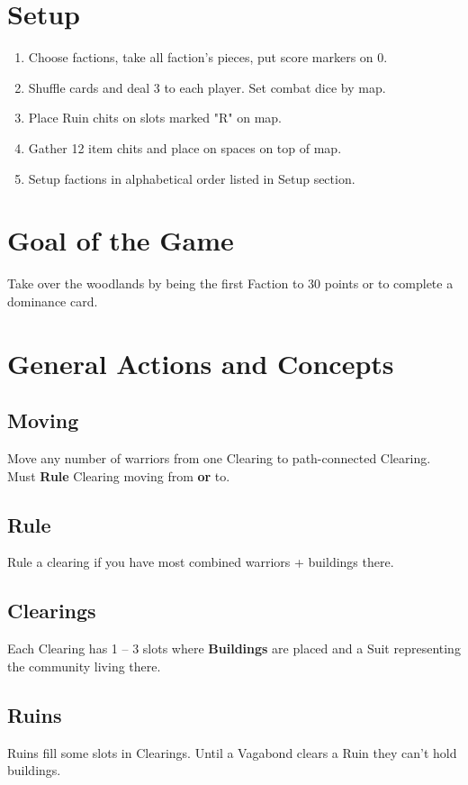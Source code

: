 \documentclass[12pt]{article}
\newenvironment{enumerateCustom}
{\begin{enumerate}
  \setlength{\itemsep}{1pt}
  \setlength{\parskip}{0pt}
  \setlength{\parsep}{0pt}}
{\end{enumerate}}
\begin{document}
\begin{multicols*}{2}

\section*{Setup}
\begin{enumerateCustom}
    \item Choose factions, take all faction's pieces, put score markers on 0.
    \item Shuffle cards and deal 3 to each player. Set combat dice by map.
    \item Place Ruin chits on slots marked "R" on map.
    \item Gather 12 item chits and place on spaces on top of map.
    \item Setup factions in alphabetical order listed in Setup section.
\end{enumerateCustom}

\section*{Goal of the Game}
Take over the woodlands by being the first Faction to 30 points or to complete a dominance card.

\section*{General Actions and Concepts}
\subsection*{Moving}
Move any number of warriors from one Clearing to path-connected Clearing. Must \textbf{Rule} Clearing moving from \textbf{or} to.

\subsection*{Rule}
Rule a clearing if you have most combined warriors + buildings there.

\subsection*{Clearings}
Each Clearing has 1 -- 3 slots where \textbf{Buildings} are placed and a Suit representing the community living there.

\subsection*{Ruins}
Ruins fill some slots in Clearings. Until a Vagabond clears a Ruin they can't hold buildings.


\end{multicols*}
\end{document}
